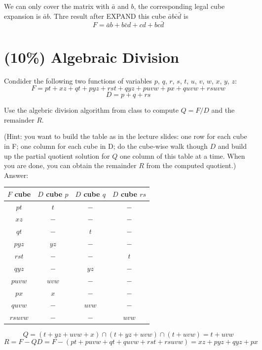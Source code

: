\documentclass[12pt]{article}
\begin{document}
We can only cover the matrix with $\bar{a}$ and $b$,
the corresponding legal cube expansion is $\bar{a}b$.
Thre result after EXPAND this cube $\bar{a}b\bar{c}\bar{d}$ is
\[F = \bar{a}b + b\bar{c}d + cd + bc\bar{d}\]

\section{(10\%) Algebraic Division}
Condider the following two functions of variables $p$, $q$, $r$, $s$, $t$, $u$, $v$, $w$, $x$, $y$, $z$:
\[F=pt+xz+qt+pyz+rst+qyz+puvw+px+quvw+rsuvw\]
\[D=p+q+rs\]

Use the algebric division algorithm from class to compute $Q=F/D$ and the remainder $R$.

(Hint: you want to build the table as in the lecture slides:
one row for each cube in F\@;
one column for each cube in D\@;
do the cube-wise walk though $D$ and build up the partial quotient solution for $Q$ one column of this table at a time.
When you are done,
you can obtain the remainder $R$ from the computed quotient.)\\

Answer:

\begin{center}
    \tabcolsep=8pt
    \begin{tabular}{|c|c|c|c|}
        \hline
        $F$ cube & $D$ cube $p$ & $D$ cube $q$ & $D$ cube $rs$ \\
        \hline
        $pt$    & $t$   & $-$   & $-$   \\
        $xz$    & $-$   & $-$   & $-$   \\
        $qt$    & $-$   & $t$   & $-$   \\
        $pyz$   & $yz$  & $-$   & $-$   \\
        $rst$   & $-$   & $-$   & $t$   \\
        $qyz$   & $-$   & $yz$  & $-$   \\
        $puvw$  & $uvw$ & $-$   & $-$   \\
        $px$    & $x$   & $-$   & $-$   \\
        $quvw$  & $-$   & $uvw$ & $-$   \\
        $rsuvw$ & $-$   & $-$   & $uvw$ \\
        \hline
    \end{tabular}
\end{center}

\[Q=(t+yz+uvw+x)\cap{(t+yz+uvw)}\cap{(t+uvw)}=t+uvw\]
\[R=F-QD=F-(pt+puvw+qt+quvw+rst+rsuvw)=xz+pyz+qyz+px\]
\end{document}
